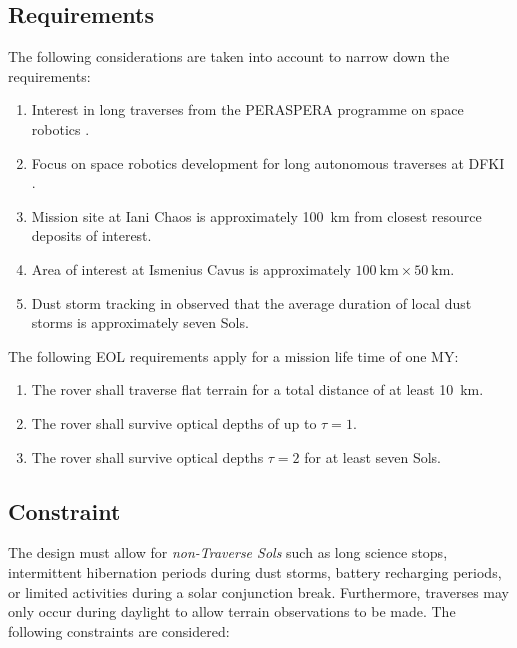 \subsection{Requirements}
\label{sec:sec:Design:RequirementsAndDesignDrivers:Requirements}
The following considerations are taken into account to narrow down the requirements:

\begin{enumerate}[label=\textcolor{BulletBlue}{(\alph*)}]
    \item Interest in long traverses from the PERASPERA programme on space robotics .
    \item Focus on space robotics development for long autonomous traverses at \ac{DFKI}  .
    \item Mission site at Iani Chaos is approximately \SI{100}{\kilo\meter} from closest resource deposits of interest.
    \item Area of interest at Ismenius Cavus is approximately $\SI{100}{\kilo\meter} \times \SI{50}{\kilo\meter}$.
    \item Dust storm tracking in  observed that the average duration of local dust storms is approximately seven Sols.
\end{enumerate}

The following \ac{EOL} requirements apply for a mission life time of one \ac{MY}:

\resetLeadingZeroCounter
\begin{enumerate}[leftmargin=1.30cm, label=\zeroLeadCounter{R}]
    \item \label{itm:req:total_distance_flat_terrain} The rover shall traverse flat terrain for a total distance of at least \SI{10}{\kilo\meter}.
    \item \label{itm:req:survive_tau1} The rover shall survive optical depths of up to $\tau = 1$.
    \item \label{itm:req:survice_tau2} The rover shall survive optical depths $\tau = 2$ for at least seven Sols.
\end{enumerate}

\subsection{Constraint}
\label{sec:Design:RequirementsAndDesignDrivers:Constraints}
The design must allow for \textit{non-Traverse Sols} such as long science stops, intermittent hibernation periods during dust storms, battery recharging periods, or limited activities during a solar conjunction break. Furthermore, traverses may only occur during daylight to allow terrain observations to be made. The following constraints are considered:

